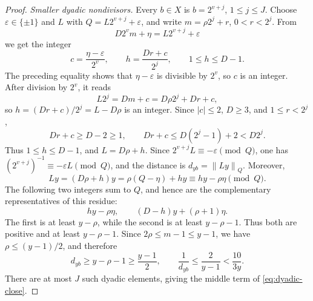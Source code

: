 \documentclass[11pt]{article}
\theoremstyle{definition}
\theoremstyle{remark}
\newcommand{\normQ}[1]{\left\lVert #1\right\rVert_Q}
\begin{document}
\begin{proof}
\smallskip
\noindent\emph{Smaller dyadic nondivisors.}
Every \(b\in X\) is \(b=2^{v+j}\), \(1\le j\le J\).  Choose
\(\varepsilon\in\{\pm1\}\) and \(L\) with
\(Q=L2^{v+j}+\varepsilon\), and write
\(m=\rho2^j+r\), \(0<r<2^j\).  From
\[
 D2^vm+\eta=L2^{v+j}+\varepsilon
\]
we get the integer
\[
 c=\frac{\eta-\varepsilon}{2^v},\qquad
 h=\frac{Dr+c}{2^j},\qquad 1\le h\le D-1.
\]
The preceding equality shows that \(\eta-\varepsilon\) is divisible by
\(2^v\), so \(c\) is an integer.  After division by \(2^v\), it reads
\[
 L2^j=Dm+c=D\rho2^j+Dr+c,
\]
so \(h=(Dr+c)/2^j=L-D\rho\) is an integer.  Since \(|c|\le2\),
\(D\ge3\), and \(1\le r<2^j\),
\[
 Dr+c\ge D-2\ge1,
 \qquad
 Dr+c\le D(2^j-1)+2<D2^j.
\]
Thus \(1\le h\le D-1\), and \(L=D\rho+h\).  Since
\(2^{v+j}L\equiv-\varepsilon\pmod Q\), one has
\((2^{v+j})^{-1}\equiv-\varepsilon L\pmod Q\), and the distance is
\(d_{yb}=\normQ{Ly}\).  Moreover,
\[
 Ly=(D\rho+h)y=\rho(Q-\eta)+hy
 \equiv hy-\rho\eta\pmod Q.
\]
The following two integers sum to \(Q\), and hence are the complementary
representatives of this residue:
\[
 hy-\rho\eta,\qquad (D-h)y+(\rho+1)\eta.
\]
The first is at least \(y-\rho\), while the second is at least
\(y-\rho-1\).  Thus both are positive and at least \(y-\rho-1\).  Since
\(2\rho\le m-1\le y-1\), we have
\(\rho\le(y-1)/2\), and therefore
\[
 d_{yb}\ge y-\rho-1\ge\frac{y-1}{2},
 \qquad \frac1{d_{yb}}\le\frac2{y-1}<\frac{10}{3y}.
\]
There are at most \(J\) such dyadic elements, giving the middle term of
\eqref{eq:dyadic-close}.


\end{proof}
\end{document}
